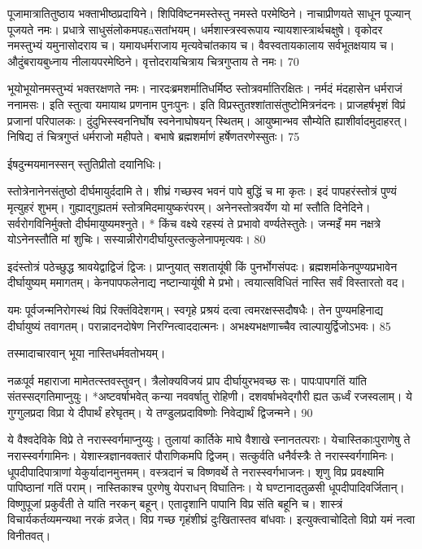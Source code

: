 पूजामात्रातितुष्ठाय भक्ताभीष्ठप्रदायिने।
शिपिविष्टनमस्तेस्तु नमस्ते परमेष्ठिने।
नाचाप्रीणयते साधून पूज्यान् पूजयते नमः।
प्रधात्रे साधुसंलोकमपहāसतांभयम्।
धर्मशास्त्रस्वरूपाय न्यायशास्त्रार्थचक्षुषे।
वृकोदर नमस्तुभ्यं यमुनासोदराय च।
यमायधर्मराजाय मृत्यवेचांतकाय च।
वैवस्वतायकालाय सर्वभूतक्षयाय च।
औदुंबरायबुध्नाय नीलायपरमेष्ठिने।
वृत्तोदरायचित्राय चित्रगुप्ताय ते नमः।
70

भूयोभूयोनमस्तुभ्यं भक्तरक्षणते नमः।
नारदःब्रमशर्मातिधर्मिष्ठ स्तोत्रवर्मातिरक्षितः।
नर्मदं मंदहासेन धर्मराजं ननामसः।
इति स्तुत्वा यमायाथ प्रणनाम पुनःपुनः।
इति विप्रस्तुतश्शांतासंतुष्टोमित्रनंदनः।
प्राजहर्षभृशं विप्रं प्रजानां परिपालकः।
दुंदुभिस्स्वननिर्घोष स्वनेनाघोषयन् स्थितम्।
आयुष्मान्भव सौम्येति ह्याशीर्वादमुदाहरत्।
निषिद्य तं चित्रगुप्तं धर्मराजो महीपते।
बभाषे ब्रह्मशर्माणं हर्षेणतरणेस्सुतः।
75

ईषदुन्मयमानस्सन् स्तुतिप्रीतो दयानिधिः।

स्तोत्रेनानेनसंतुष्ठो दीर्घमायुर्ददामि ते।
शीघ्रं गच्छस्व भवनं पापे बुद्धिं च मा कृतः।
इदं पापहरंस्तोत्रं पुण्यं मृत्युहरं शुभम्।
गुह्याद्गुह्यतमं स्तोत्रमिदमायुष्करंपरम्।
अनेनस्तोत्रवर्येण यो मां स्तौति दिनेदिने।
सर्वरोगविनिर्मुक्तो दीर्घमायुष्यमश्नुते।
* किंच वक्ष्ये रहस्यं ते प्रभावो वर्ण्यतेस्तुतेः।
जन्मइँ मम नक्षत्रे योऽनेनस्तौति मां शुचिः।
सस्यान्नीरोगदीर्घायुस्तत्कुलेनापमृत्यवः।
80

इदंस्तोत्रं पठेच्छुद्ध श्रावयेद्वाद्विजं द्विजः।
प्राप्नुयात् सशतायूंषी किं पुनर्भोगसंपदः।
ब्रह्मशर्माकेनपुण्यप्रभावेन दीर्घायुष्यम् ममागतम्।
केनपापफलेनाद्य नष्टान्यायूंषी मे प्रभो।
त्वयात्सविधितं नास्ति सर्वं विस्तारतो वद।

यमः
पूर्वजन्मनिरोगस्थं विप्रं रिक्तंविदेशगम्।
स्वगृहे प्रश्रयं दत्वा त्वमरक्षस्सदौषधैः।
तेन पुण्यमहिनाद्य दीर्घायुष्यं तवागतम्।
परान्नादनदोषेण निरग्नित्वाददात्मनः।
अभक्ष्यभक्षणाच्चैव त्वाल्पायुर्द्विजोऽभवः।
85

तस्मादाचारवान् भूया नास्तिधर्मवतोभयम्।

नळःपूर्व महाराजा मामेतत्स्तवस्तुवन्।
त्रैलोक्यविजयं प्राप दीर्घायुरभवच्छ सः।
पापःपापगतिं यांति संतस्सद्गतिमाप्नुयुः।
*अष्टवर्षाभवेत् कन्या नववर्षातु रोहिणी।
दशवर्षाभवेद्गौरी ह्यत ऊर्ध्वं रजस्वलाम्।
ये गुग्गुलप्रदा विप्रा ये दीपार्थं हरेघृतम्।
ये तण्डुलप्रदाविष्णोः निवेद्यार्थं द्विजन्मने।
90

ये वैश्वदेविके विप्रे ते नरास्स्वर्गमाप्नुय्युः।
तुलायां कार्तिके माघे वैशाखे स्नानतत्पराः।
येचास्तिकाःपुराणेषु ते नरास्स्वर्गगामिनः।
येशास्त्रज्ञानवक्तारं पौराणिकमपि द्विजम्।
सत्कुर्वति धनैर्वस्त्रैः ते नरास्स्वर्गगामिनः।
धूपदीपादिपात्राणां येकुर्यादानमुत्तमम्।
वस्त्रदानं च विष्णवर्थे ते नरास्स्वर्गभाजनः।
शृणु विप्र प्रवक्ष्यामि पापिष्ठानां गतिं पराम्।
नास्तिकाश्च पुरणेषु येपराधन् विघातिनः।
ये घण्टानादतुळसी धूपदीपादिवर्जितान्।
विष्णुपूजां प्रकुर्वंती ते यांति नरकन् बहून्।
एतादृशानि पापानि विप्र संति बहूनि च।
शास्त्रं विचार्यकर्तव्यमन्यथा नरकं व्रजेत्।
विप्र गच्छ गृहंशीघ्रं दुःखितास्तव बांधवाः।
इत्युक्त्वाचोदितो विप्रो यमं नत्वा विनीतवत्।

